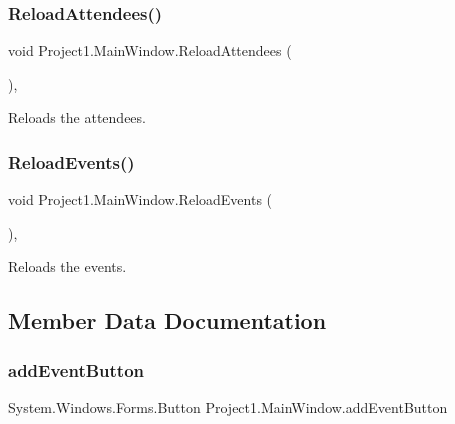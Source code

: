 \subsubsection{\texorpdfstring{Reload\+Attendees()}{ReloadAttendees()}}
{\footnotesize\ttfamily void Project1.\+Main\+Window.\+Reload\+Attendees (\begin{DoxyParamCaption}{ }\end{DoxyParamCaption})\hspace{0.3cm}{\ttfamily [inline]}, {\ttfamily [package]}}



Reloads the attendees. 

\mbox{\label{classProject1_1_1MainWindow_aef6b435caef02f80d3f3752684cf00f6}} 
\subsubsection{\texorpdfstring{Reload\+Events()}{ReloadEvents()}}
{\footnotesize\ttfamily void Project1.\+Main\+Window.\+Reload\+Events (\begin{DoxyParamCaption}{ }\end{DoxyParamCaption})\hspace{0.3cm}{\ttfamily [inline]}, {\ttfamily [package]}}



Reloads the events. 



\subsection{Member Data Documentation}
\mbox{\label{classProject1_1_1MainWindow_a3d99b09991f5611424ec9886d8805fce}} 
\subsubsection{\texorpdfstring{add\+Event\+Button}{addEventButton}}
{\footnotesize\ttfamily System.\+Windows.\+Forms.\+Button Project1.\+Main\+Window.\+add\+Event\+Button\hspace{0.3cm}{\ttfamily [private]}}

